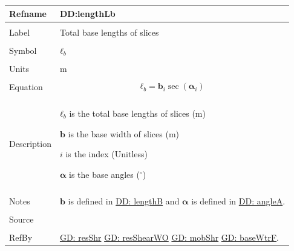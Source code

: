 \documentclass[12pt]{article}
\begin{document}
\noindent \begin{minipage}{\textwidth}
\begin{tabular}{p{} p{}}
\toprule \textbf{Refname} & \textbf{DD:lengthLb}
\label{DD:lengthLb}
\\ \midrule \\
Label & Total base lengths of slices
\\ \midrule \\
Symbol & ${\mathbf{ℓ}_{b}}$
\\ \midrule \\
Units & m
\\ \midrule \\
Equation & \begin{displaymath}
           {\mathbf{ℓ}_{b}}={\mathbf{b}}_{i} \sec\left({\mathbf{α}}_{i}\right)
           \end{displaymath}
\\ \midrule \\
Description & \begin{symbDescription}
              \item{${\mathbf{ℓ}_{b}}$ is the total base lengths of slices (m)}
              \item{$\mathbf{b}$ is the base width of slices (m)}
              \item{$i$ is the index (Unitless)}
              \item{$\mathbf{α}$ is the base angles (${}^{\circ}$)}
              \end{symbDescription}
\\ \midrule \\
Notes & $\mathbf{b}$ is defined in \hyperref[DD:lengthB]{DD: lengthB} and $\mathbf{α}$ is defined in \hyperref[DD:angleA]{DD: angleA}.
\\ \midrule \\
Source & \cite{fredlund1977}
\\ \midrule \\
RefBy & \hyperref[GD:resShr]{GD: resShr} \hyperref[GD:resShearWO]{GD: resShearWO} \hyperref[GD:mobShr]{GD: mobShr} \hyperref[GD:baseWtrF]{GD: baseWtrF}.
\\ \bottomrule \end{tabular}
\end{minipage}
\par~
\end{document}
